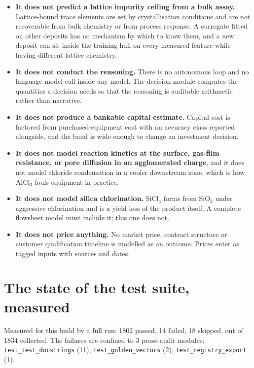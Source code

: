 \documentclass[10pt,a4paper,twoside]{report}
\begin{document}
\begin{itemize}
\item \textbf{It does not predict a lattice impurity ceiling from a bulk
      assay.} Lattice-bound trace elements are set by crystallisation
      conditions and are not recoverable from bulk chemistry or from process
      response. A surrogate fitted on other deposits has no mechanism by which
      to know them, and a new deposit can sit inside the training hull on every
      measured feature while having different lattice chemistry.
\item \textbf{It does not conduct the reasoning.} There is no autonomous loop
      and no language-model call inside any model. The decision module computes
      the quantities a decision needs so that the reasoning is auditable
      arithmetic rather than narrative.
\item \textbf{It does not produce a bankable capital estimate.} Capital cost is
      factored from purchased-equipment cost with an accuracy class reported
      alongside, and the band is wide enough to change an investment decision.
\item \textbf{It does not model reaction kinetics at the surface, gas-film
      resistance, or pore diffusion in an agglomerated charge}, and it does not
      model chloride condensation in a cooler downstream zone, which is how
      AlCl$_3$ fouls equipment in practice.
\item \textbf{It does not model silica chlorination.} SiCl$_4$ forms from
      SiO$_2$ under aggressive chlorination and is a yield loss of the product
      itself. A complete flowsheet model must include it; this one does not.
\item \textbf{It does not price anything.} No market price, contract structure
      or customer qualification timeline is modelled as an outcome. Prices
      enter as tagged inputs with sources and dates.
\end{itemize}

\section{The state of the test suite, measured}

Measured for this build by a full run: 1802 passed, 14 failed, 18 skipped, out of 1834 collected. The failures are confined to 3 prose-audit modules: \texttt{test\_test\_docstrings} (11), \texttt{test\_golden\_vectors} (2), \texttt{test\_registry\_export} (1).
\end{document}
